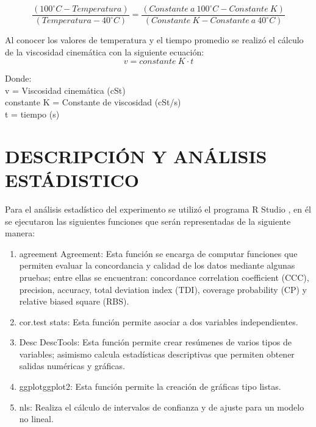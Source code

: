 \documentclass[12pt, letterpaper]{article}
\begin{document}
\begin{equation}
\label{ec3}
\frac{(100^{\circ}C - Temperatura)}{(Temperatura - 40^{\circ}C)} = \frac{(Constante \> a \> 100^{\circ}C -Constante \> K)}{(Constante \> K - Constante \> a \> 40^{\circ}C)}
\end{equation}

Al conocer los valores de temperatura y el tiempo promedio se realizó el cálculo de la viscosidad cinemática con la siguiente ecuación:
\begin{equation}
\label{ec4}
v = constante \> K\cdot t
\end{equation}
 
Donde:\\ 
v = Viscosidad cinemática (cSt)\\
constante K = Constante de viscosidad (cSt/s)\\ 
t = tiempo (s)

\section{DESCRIPCIÓN Y ANÁLISIS ESTÁDISTICO}

Para el análisis estadístico del experimento se utilizó el programa R Studio \cite{rstudio}, en él se ejecutaron las siguientes funciones que serán representadas de la siguiente manera:

\begin{enumerate}
    \item agreement {Agreement}: Esta función se encarga de computar funciones que permiten evaluar la concordancia y calidad de los datos mediante algunas pruebas; entre ellas se encuentran: concordance correlation coefficient (CCC), precision, accuracy, total deviation index (TDI), coverage probability (CP) y relative biased square (RBS).
    \item cor.test {stats}: Esta función permite asociar a dos variables independientes.
    \item Desc {DescTools}: Esta función permite crear resúmenes de varios tipos de variables; asimismo calcula estadísticas descriptivas que permiten obtener salidas numéricas y gráficas.
    \item ggplot{ggplot2}: Esta función permite la creación de gráficas tipo listas.
    \item nls: Realiza el cálculo de intervalos de confianza y de ajuste para un modelo no lineal.
\end{enumerate}
\end{document}
